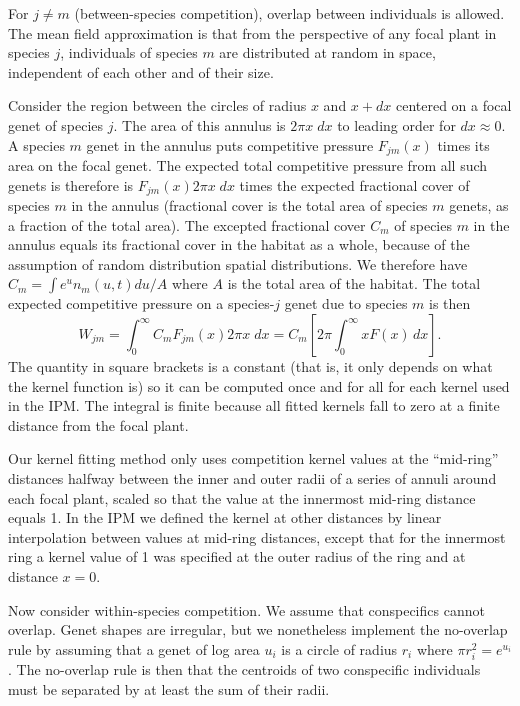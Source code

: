 \documentclass[11pt]{article}
\begin{document}
For $j \ne m$ (between-species competition), overlap between individuals is allowed. The mean field approximation is 
that from the perspective of any focal plant in species $j$, individuals of species $m$ are distributed at random in space, 
independent of each other and of their size.

Consider the region between the circles of radius $x$ and $x+dx$ centered on a focal genet of species $j$. The area of this annulus
is $2 \pi x \; dx$  to leading order for $dx \approx 0$. A species $m$ genet 
in the annulus puts competitive pressure $F_{jm}(x)$ times its area on
the focal genet. The expected total competitive pressure from all such genets 
is therefore is $F_{jm}(x) 2 \pi x \; dx$ times the expected fractional cover of species $m$ in the annulus 
(fractional cover is the total area of species $m$ genets, as a fraction of the total area). The excepted fractional cover $C_m$ of species $m$
in the annulus equals its fractional cover in the habitat as a whole, because of the assumption of random distribution
spatial distributions. We therefore have $C_m  = \int e^u n_m(u,t) du/A$ where $A$ is the total area of the habitat. 
The total expected competitive pressure on a species-$j$ genet due to species $m$ is then 
\begin{equation}
W_{jm} = \int_0^\infty{C_m F_{jm}(x) 2 \pi x \; dx}  = C_m \left [2 \pi \int_0^{\infty} x F(x) \, dx \right ].
\label{eqn:wbarm}
\end{equation} 
The quantity in square brackets is a constant (that is, it only depends on what the kernel function
is) so it can be computed once and for all for each kernel used in the IPM. The integral is finite because
all fitted kernels fall to zero at a finite distance from the focal plant. 

Our kernel fitting method only uses competition kernel values at the ``mid-ring'' distances
halfway between the inner and outer radii of a series of annuli around each focal
plant, scaled so that the value at the innermost mid-ring distance equals 1. 
In the IPM we defined the kernel at other distances by linear interpolation between values at 
mid-ring distances, except that for the innermost ring a kernel value of 1 was specified at the
outer radius of the ring and at distance $x=0$. 

Now consider within-species competition. We assume that conspecifics cannot overlap. Genet shapes are irregular, but we 
nonetheless implement the no-overlap rule by assuming that a genet of log area $u_i$ is a 
circle of radius $r_i$ where $\pi r_i^2 = e^{u_i}$. The no-overlap rule is then that the centroids of two conspecific individuals 
must be separated by at least the sum of their radii. 
\end{document}
